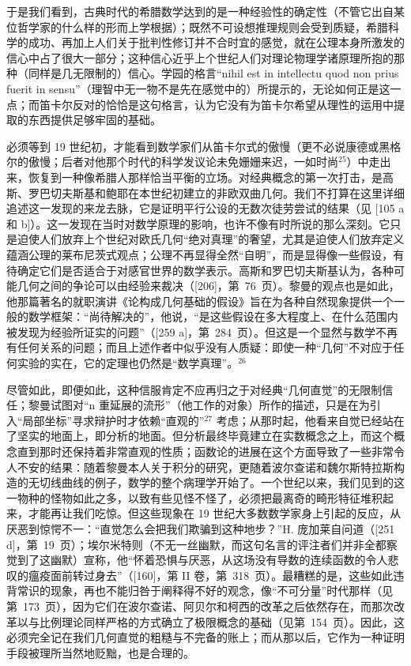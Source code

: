 于是我们看到，古典时代的希腊数学达到的是一种经验性的确定性（不管它出自某位哲学家的什么样的形而上学根据）；既然不可设想推理规则会受到质疑，希腊科学的成功、再加上人们关于批判性修订并不合时宜的感觉，就在公理本身所激发的信心中占了很大一部分；这种信心近乎上个世纪人们对理论物理学诸原理所抱的那种（同样是几无限制的）信心。学园的格言“nihil est in intellectu quod non prius fuerit in sensu”（理智中无一物不是先在感觉中的）所提示的，无论如何正是这一点；而笛卡尔反对的恰恰是这句格言，认为它没有为笛卡尔希望从理性的运用中提取的东西提供足够牢固的基础。

必须等到 19 世纪初，才能看到数学家们从笛卡尔式的傲慢（更不必说康德或黑格尔的傲慢；后者对他那个时代的科学发议论未免姗姗来迟，一如时尚\(^{25}\)）中走出来，恢复到一种像希腊人那样恰当平衡的立场。对经典概念的第一次打击，是高斯、罗巴切夫斯基和鲍耶在本世纪初建立的非欧双曲几何。我们不打算在这里详细追述这一发现的来龙去脉，它是证明平行公设的无数次徒劳尝试的结果（见 {[}105 a 和 b{]}）。这一发现在当时对数学原理的影响，也许不像有时所说的那么深刻。它只是迫使人们放弃上个世纪对欧氏几何“绝对真理”的奢望，尤其是迫使人们放弃定义蕴涵公理的莱布尼茨式观点；公理不再显得全然“自明”，而是显得像一些假设，有待确定它们是否适合于对感官世界的数学表示。高斯和罗巴切夫斯基认为，各种可能几何之间的争论可以由经验来裁决（{[}206{]}，第~76~页）。黎曼的观点也是如此，他那篇著名的就职演讲《论构成几何基础的假设》旨在为各种自然现象提供一个一般的数学框架：“尚待解决的”，他说，“是这些假设在多大程度上、在什么范围内被发现为经验所证实的问题”（{[}259 a{]}，第~284~页）。但这是一个显然与数学不再有任何关系的问题；而且上述作者中似乎没有人质疑：即使一种“几何”不对应于任何实验的实在，它的定理也仍然是“数学真理”。\(^{26}\)

尽管如此，即便如此，这种信服肯定不应再归之于对经典“几何直觉”的无限制信任；黎曼试图对“n 重延展的流形”（他工作的对象）所作的描述，只是在为引入“局部坐标”寻求辩护时才依赖“直观的”\(^{27}\) 考虑；从那时起，他看来自觉已经站在了坚实的地面上，即分析的地面。但分析最终毕竟建立在实数概念之上，而这个概念直到那时还保持着非常直观的性质；函数论的进展在这个方面导致了一些非常令人不安的结果：随着黎曼本人关于积分的研究，更随着波尔查诺和魏尔斯特拉斯构造的无切线曲线的例子，数学的整个病理学开始了。一个世纪以来，我们见到的这一物种的怪物如此之多，以致有些见怪不怪了，必须把最离奇的畸形特征堆积起来，才能再让我们吃惊。但这些现象在 19 世纪大多数数学家身上引起的反应，从厌恶到惊愕不一：“直觉怎么会把我们欺骗到这种地步？”H. 庞加莱自问道（{[}251 d{]}，第~19~页）；埃尔米特则（不无一丝幽默，而这句名言的评注者们并非全都察觉到了这幽默）宣称，他“怀着恐惧与厌恶，从这场没有导数的连续函数的令人悲叹的瘟疫面前转过身去”（{[}160{]}，第 II 卷，第~318~页）。最糟糕的是，这些如此违背常识的现象，再也不能归咎于阐释得不好的观念，像“不可分量”时代那样（见第~173~页），因为它们在波尔查诺、阿贝尔和柯西的改革之后依然存在，而那次改革以与比例理论同样严格的方式确立了极限概念的基础（见第~154~页）。因此，这必须完全记在我们几何直觉的粗糙与不完备的账上；而从那以后，它作为一种证明手段被理所当然地贬黜，也是合理的。

